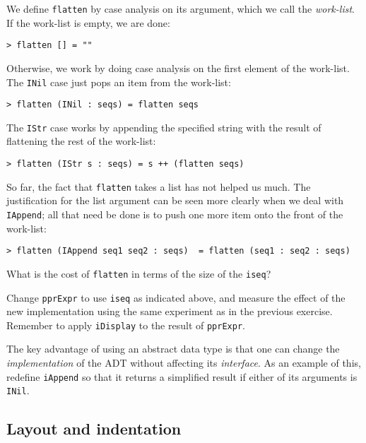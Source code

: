 We define \mbox{\tt flatten} by case analysis on its argument, which we call
the {\em work-list}.
If the work-list is empty, we are done:
\begin{verbatim}
> flatten [] = ""
\end{verbatim}
%
Otherwise, we work by doing case analysis on the first element of
the work-list.
The \mbox{\tt INil} case just pops an item from the work-list:
\begin{verbatim}
> flatten (INil : seqs) = flatten seqs
\end{verbatim}
%
The \mbox{\tt IStr} case works by appending the specified string with
the result of flattening the rest of the work-list:
\begin{verbatim}
> flatten (IStr s : seqs) = s ++ (flatten seqs)
\end{verbatim}
%
So far, the fact that \mbox{\tt flatten} takes a list has not helped us much.
The justification for the list argument can be seen more clearly when
we deal with \mbox{\tt IAppend}; all that need be done is to push one more
item onto the front of the work-list:
\begin{verbatim}
> flatten (IAppend seq1 seq2 : seqs)  = flatten (seq1 : seq2 : seqs)
\end{verbatim}
%
\begin{exercise}
What is the cost of \mbox{\tt flatten} in terms of the size of the \mbox{\tt iseq}?

Change \mbox{\tt pprExpr} to use \mbox{\tt iseq} as indicated above,
and measure the effect of the new implementation
using the same experiment as
in the previous exercise.  Remember to apply \mbox{\tt iDisplay} to the result
of \mbox{\tt pprExpr}.
\end{exercise}

\begin{exercise}
The key advantage of using an abstract data type is that one can
change the {\em implementation\/} of the ADT without affecting its
{\em interface}.  As an example of this, redefine \mbox{\tt iAppend} so that
it returns a simplified result if either of its arguments is \mbox{\tt INil}.
\end{exercise}

\subsection{Layout and indentation}

